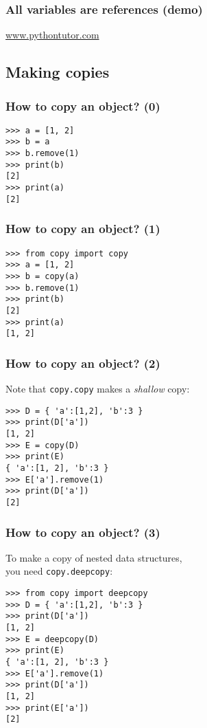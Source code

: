 \documentclass[english,serif,mathserif,xcolor=pdftex,dvipsnames,table]{beamer}
\begin{document}
\begin{frame}[fragile]
  \frametitle{All variables are references (demo)}

  \href{http://www.pythontutor.com/}{www.pythontutor.com}
  \+


\end{frame}


\subsection{Making copies}

\begin{frame}[fragile]
  \frametitle{How to copy an object? (0)}
  \begin{lstlisting}
>>> a = [1, 2]
>>> b = a
>>> b.remove(1)
>>> print(b)
[2]
>>> print(a)
[2]
  \end{lstlisting}
\end{frame}


\begin{frame}[fragile]
  \frametitle{How to copy an object? (1)}
  \begin{lstlisting}
>>> from copy import copy
>>> a = [1, 2]
>>> b = copy(a)
>>> b.remove(1)
>>> print(b)
[2]
>>> print(a)
[1, 2]
  \end{lstlisting}
\end{frame}


\begin{frame}[fragile]
  \frametitle{How to copy an object? (2)}
Note that \texttt{copy.copy} makes a \emph{shallow} copy:
  \begin{lstlisting}
>>> D = { 'a':[1,2], 'b':3 }
>>> print(D['a'])
[1, 2]
>>> E = copy(D)
>>> print(E)
{ 'a':[1, 2], 'b':3 }
>>> E['a'].remove(1)
>>> print(D['a'])
[2]
  \end{lstlisting}
\end{frame}


\begin{frame}[fragile]
  \frametitle{How to copy an object? (3)}
  To make a copy of nested data structures, \\
  you need \texttt{copy.deepcopy}:
\begin{lstlisting}
>>> from copy import deepcopy
>>> D = { 'a':[1,2], 'b':3 }
>>> print(D['a'])
[1, 2]
>>> E = deepcopy(D)
>>> print(E)
{ 'a':[1, 2], 'b':3 }
>>> E['a'].remove(1)
>>> print(D['a'])
[1, 2]
>>> print(E['a'])
[2]
  \end{lstlisting}
\end{frame}
\end{document}
